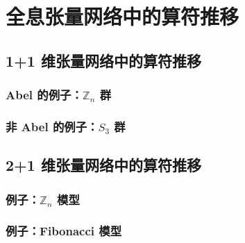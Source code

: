 \chapter{全息张量网络中的算符推移}
\label{chap:operator-pushing}

\section{1+1 维张量网络中的算符推移}

\subsection{Abel 的例子：\texorpdfstring{$\mathbb{Z}_n$}{ℤₙ} 群}
\subsection{非 Abel 的例子：\texorpdfstring{$S_3$}{𝑆₃} 群}

\section{2+1 维张量网络中的算符推移}

\subsection{例子：\texorpdfstring{$\mathbb{Z}_n$}{ℤₙ} 模型}
\subsection{例子：Fibonacci 模型}
